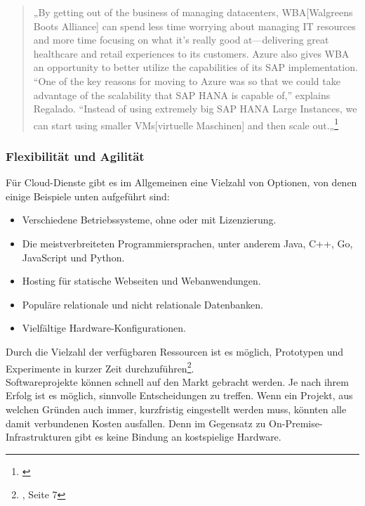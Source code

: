 \begin{quote}
      „By getting out of the business of managing datacenters, WBA[Walgreens Boots Alliance] can spend less time worrying about managing IT resources and more time focusing on what it’s really good at—delivering great healthcare and retail experiences to its customers. Azure also gives WBA an opportunity to better utilize the capabilities of its SAP implementation. “One of the key reasons for moving to Azure was so that we could take advantage of the scalability that SAP HANA is capable of,” explains Regalado. “Instead of using extremely big SAP HANA Large Instances, we can start using smaller VMs[virtuelle Maschinen] and then scale out.„\footnote{\cite{AZU01}}
\end{quote}

\subsubsection{Flexibilität und Agilität}
Für Cloud-Dienste gibt es im Allgemeinen eine Vielzahl von Optionen, von denen einige Beispiele unten aufgeführt sind:
\begin{itemize}
\item
    Verschiedene Betriebssysteme, ohne oder mit Lizenzierung.
\item
    Die meistverbreiteten Programmiersprachen, unter anderem Java, C++, Go, JavaScript und Python.{\cite{AMZ03}}
\item
    Hosting für statische Webseiten und Webanwendungen{\cite{AMZ04}}.
\item
    Populäre relationale und nicht relationale Datenbanken{\cite{AMZ10}}.           
\item
    Vielfältige Hardware-Konfigurationen.

\end{itemize}
\begin{flushleft}
Durch die Vielzahl der verfügbaren Ressourcen ist es möglich, Prototypen und Experimente in kurzer Zeit durchzuführen\footnote{\cite{IDC01}, Seite 7}.
\\
Softwareprojekte können schnell auf den Markt gebracht werden. Je nach ihrem Erfolg ist es möglich, sinnvolle Entscheidungen zu treffen. Wenn ein Projekt, aus welchen Gründen auch immer, kurzfristig eingestellt werden muss, könnten alle damit verbundenen Kosten ausfallen. Denn im Gegensatz zu On-Premise-Infrastrukturen gibt es keine Bindung an kostspielige Hardware.
\end{flushleft}

